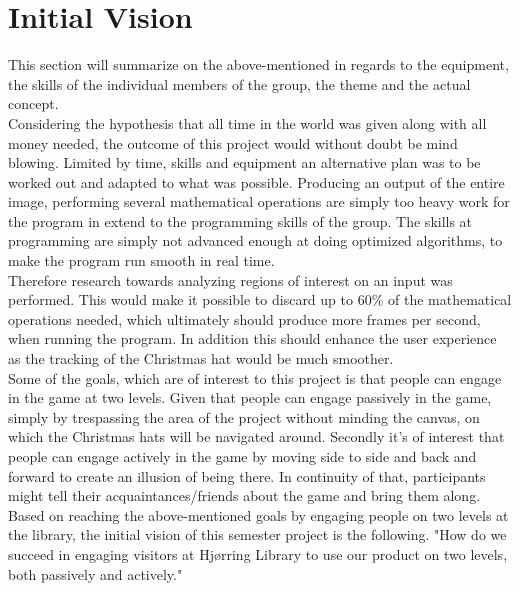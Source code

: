 \section{Initial Vision}
This section will summarize on the above-mentioned in regards to the equipment, the skills of the individual members of the group, the theme and the actual concept.\\
Considering the hypothesis that all time in the world was given along with all money needed, the outcome of this project would without doubt be mind blowing. Limited by time, skills and equipment an alternative plan was to be worked out and adapted to what was possible. Producing an output of the entire image, performing several mathematical operations are simply too heavy work for the program in extend to the programming skills of the group. The skills at programming are simply not advanced enough at doing optimized algorithms, to make the program run smooth in real time. \\
Therefore research towards analyzing regions of interest on an input was performed. This would make it possible to discard up to 60{\%} of the mathematical operations needed, which ultimately should produce more frames per second, when running the program. In addition this should enhance the user experience as the tracking of the Christmas hat would be much smoother.
\\
Some of the goals, which are of interest to this project is that people can engage in the game at two levels. Given that people can engage passively in the game, simply by trespassing the area of the project without minding the canvas, on which the Christmas hats will be navigated around. Secondly it's of interest that people can engage actively in the game by moving side to side and back and forward to create an illusion of being there. In continuity of that, participants might tell their acquaintances/friends about the game and bring them along.
\\
Based on reaching the above-mentioned goals by engaging people on two levels at the library, the initial vision of this semester project is the following. "How do we succeed in engaging visitors at Hj{\o}rring Library to use our product on two levels, both passively and actively."

